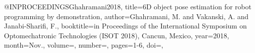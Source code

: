 @INPROCEEDINGS{Ghahramani2018,
title={6D object pose estimation for robot programming by demonstration},
author={Ghahramani, M. and Vakanski, A. and Janabi-Sharifi, F.},
booktitle={in Proceedings of the International Symposium on Optomechatronic Technologies (ISOT 2018), Cancun, Mexico},
year={2018},
month={Nov.},
volume={},
number={},
pages={1-6},
doi={}, } 
